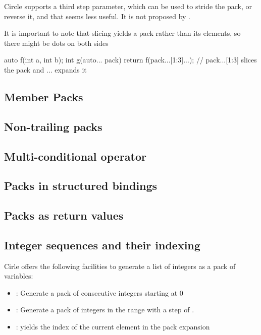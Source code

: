 \documentclass{wg21}
\begin{document}
Circle supports a third step parameter, which can be used to stride the pack, or reverse it,
and that seems less useful. It is not proposed by .

It is important to note that slicing yields a pack rather than its elements, so there might be dots on both sides

\begin{colorblock}
auto f(int a, int b);
int g(auto... pack) {
    return f(pack...[1:3]...); // pack...[1:3] slices the pack and ... expands it
}
\end{colorblock}

\subsection{Member Packs}

\subsection{Non-trailing packs}

\subsection{Multi-conditional operator}

\subsection{Packs in structured bindings}

\subsection{Packs as return values}

\subsection{Integer sequences and their indexing}

Cirle offers the following facilities to generate a list of integers as a pack of variables:

\begin{itemize}
\item {} : Generate a pack of  consecutive integers starting at 0
\item {} : Generate a pack of integers in the range  with a step of .
\item {}: yields the index of the current element in the pack expansion
\end{itemize}
\end{document}
